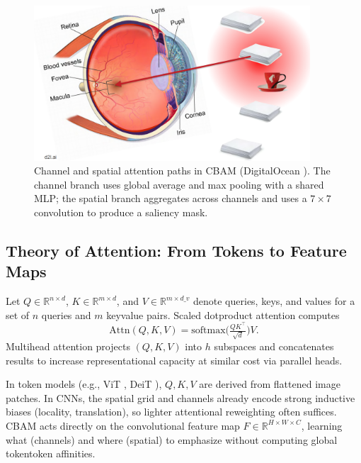 \begin{figure}[t]
  \centering
  \includegraphics[width=0.92\textwidth]{../new_work/websites/Attention Mechanisms in Computer Vision_ CBAM _ DigitalOcean_files/image-1.png}
  \caption{Channel and spatial attention paths in CBAM (DigitalOcean \cite{cbamDO}). The channel branch uses global average and max pooling with a shared MLP; the spatial branch aggregates across channels and uses a $7\times7$ convolution to produce a saliency mask.}
  \label{fig:cbam_do_paths}
\end{figure}

\subsection{Theory of Attention: From Tokens to Feature Maps}
Let $Q\in\mathbb{R}^{n\times d}$, $K\in\mathbb{R}^{m\times d}$, and $V\in\mathbb{R}^{m\times d\_v}$ denote queries, keys, and values for a set of $n$ queries and $m$ key\textendash value pairs. Scaled dot\textendash product attention \cite{vaswani2017attention} computes
\[ \mathrm{Attn}(Q,K,V) = \mathrm{softmax}\!\Big( \tfrac{QK^\top}{\sqrt{d}} \Big) V. \]
Multi\textendash head attention projects $(Q,K,V)$ into $h$ subspaces and concatenates results to increase representational capacity at similar cost via parallel heads.

In token models (e.g., ViT \cite{dosovitskiy2021vit}, DeiT \cite{touvron2021deit}), $Q,K,V$ are derived from flattened image patches. In CNNs, the spatial grid and channels already encode strong inductive biases (locality, translation), so lighter attentional reweighting often suffices. CBAM acts directly on the convolutional feature map $F\in\mathbb{R}^{H\times W\times C}$, learning \/what\/ (channels) and \/where\/ (spatial) to emphasize without computing global token\textendash token affinities.

